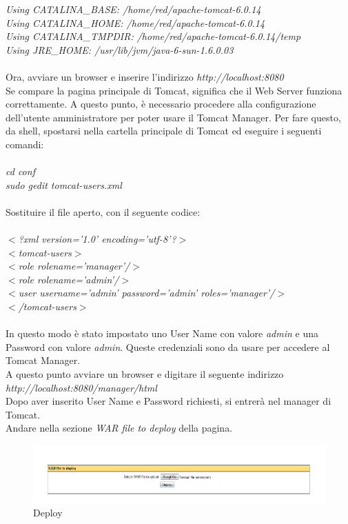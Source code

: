 \textit{Using CATALINA{\_}BASE: /home/red/apache-tomcat-6.0.14}\\
\textit{Using CATALINA{\_}HOME: /home/red/apache-tomcat-6.0.14}\\
\textit{Using CATALINA{\_}TMPDIR: /home/red/apache-tomcat-6.0.14/temp}\\
\textit{Using JRE{\_}HOME: /usr/lib/jvm/java-6-sun-1.6.0.03}\\
\\
Ora, avviare un browser e inserire l'indirizzo \textit{http://localhost:8080}\\
Se compare la pagina principale di Tomcat, significa che il Web Server funziona correttamente.
A questo punto, \`e necessario procedere alla configurazione dell'utente amministratore per poter usare il Tomcat Manager.
Per fare questo, da shell, spostarsi nella cartella principale di Tomcat ed eseguire i seguenti comandi:\\
\\
\textit{cd conf}\\
\textit{sudo gedit tomcat-users.xml}\\
\\
Sostituire il file aperto, con il seguente codice:\\
\\
\textit{$ < $?xml version='1.0' encoding='utf-8'?$ > $}\\
\textit{$ < $tomcat-users$ > $}\\
\textit{ $ < $role rolename='manager'/$ > $}\\
\textit{ $ < $role rolename='admin'/$ > $}\\
\textit{ $ < $user username='admin' password='admin' roles='manager'/$ > $}\\
\textit{$ < $/tomcat-users$ > $} \\
\\
In questo modo \`e stato impostato uno User Name con valore \textit{admin} e una Password con valore \textit{admin}. Queste credenziali sono da usare per accedere al Tomcat Manager.\\
A questo punto avviare un browser e digitare il seguente indirizzo\\ \textit{http://localhost:8080/manager/html}\\
Dopo aver inserito User Name e Password richiesti, si entrer\`a nel manager di Tomcat.\\
Andare nella sezione \textit{WAR file to deploy} della pagina.\\
 
\begin{figure}[!ht]
\centering
\includegraphics[scale=0.7]{images/DeployTomcat.png}
\caption{Deploy}
\end{figure}
 
